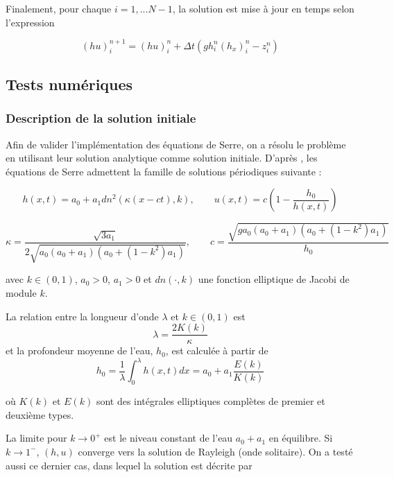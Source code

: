 \indent Finalement, pour chaque $i=1,...N-1$, la solution est mise à jour en temps selon l'expression 

\begin{equation*}
(hu)_i^{n+1} = (hu)_i^n + \Delta t \left(gh_i^n(h_x)_i^n - z_i^n \right)
\end{equation*}

\subsection{Tests numériques}

\subsubsection{Description de la solution initiale}

\indent Afin de valider l'implémentation des équations de Serre, on a résolu le problème en utilisant leur solution analytique comme solution initiale. D'après \cite{CarterCienfuegos2011}, les équations de Serre admettent la famille de solutions périodiques suivante : 

\begin{equation*}
    h(x,t) = a_0 + a_1 dn^2(\kappa(x-ct),k), \qquad
    u(x,t) = c\left( 1 - \frac{h_0}{h(x,t)}\right)
\end{equation*}

\begin{equation*}
    \kappa = \frac{\sqrt{3a_1}}{2\sqrt{a_0(a_0+a_1)(a_0+(1-k^2)a_1)}}, \qquad
    c = \frac{\sqrt{g a_0(a_0+a_1)(a_0+(1-k^2)a_1)}}{h_0}
\end{equation*}

\noindent avec $k\in(0,1)$, $a_0>0$, $a_1>0$ et $dn(\cdot,k)$ une fonction elliptique de Jacobi de module $k$.

\indent La relation entre la longueur d'onde $\lambda$ et $k\in(0,1)$ est $$\lambda = \frac{2K(k)}{\kappa}$$ et la profondeur moyenne de l'eau, $h_0$, est calculée à partir de $$h_0 = \frac{1}{\lambda}\int_{0}^\lambda h(x,t)dx = a_0 + a_1 \frac{E(k)}{K(k)}$$

\noindent où $K(k)$ et $E(k)$ sont des intégrales elliptiques complètes de premier et deuxième types. 

\indent La limite pour $k\to0^+$ est le niveau constant de l'eau $a_0+a_1$ en équilibre. Si $k\to1^-$, $(h,u)$ converge vers la solution de Rayleigh (onde solitaire). On a testé aussi ce dernier cas, dans lequel la solution est décrite par \cite{CarterCienfuegos2011}

